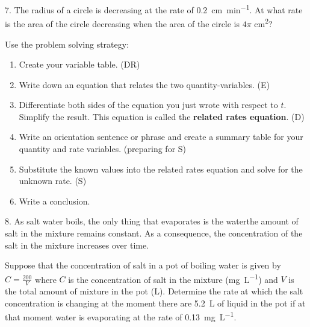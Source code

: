 \documentclass[12pt,]{book}
\newcommand{\terminology}[1]{\textbf{#1}}
\newcommand{\acronym}[1]{#1}
\theoremstyle{plain}
\theoremstyle{definition}
\numberwithin{equation}{section}
\begin{document}
\par\smallskip\noindent
\begin{exerciselist}
\item[7.]\hypertarget{exercise-548}{\null}The radius of a circle is decreasing at the rate of \SI{0.2}{\centi\meter\per\minute}. At what rate is the area of the circle decreasing when the area of the circle is \(4\pi\) \si{\centi\meter\tothe{2}}?%
\par
Use the problem solving strategy:%
\begin{enumerate}[label=(\alph*)]
\item{}Create your variable table. (\acronym{DR})\item{}Write down an equation that relates the two quantity-variables. (\acronym{E})\item{}Differentiate both sides of the equation you just wrote with respect to \(t\). Simplify the result. This equation is called the \terminology{related rates equation}. (\acronym{D})\item{}Write an orientation sentence or phrase and create a summary table for your quantity and rate variables. (preparing for \acronym{S})\item{}Substitute the known values into the related rates equation and solve for the unknown rate. (\acronym{S})\item{}Write a conclusion.\end{enumerate}
\par\smallskip
\item[8.]\hypertarget{exercise-549}{\null}As salt water boils, the only thing that evaporates is the water\textemdash{}the amount of salt in the mixture remains constant. As a consequence, the concentration of the salt in the mixture increases over time.%
\par
Suppose that the concentration of salt in a pot of boiling water is given by \(C=\frac{200}{V}\) where \(C\) is the concentration of salt in the mixture (\si{\milli\gram\per\liter}) and \(V\) is the total amount of mixture in the pot (\si{\liter}). Determine the rate at which the salt concentration is changing at the moment there are \SI{5.2}{\liter} of liquid in the pot if at that moment water is evaporating at the rate of \SI{0.13}{\milli\gram\per\liter}.%
\par\smallskip
\end{exerciselist}
\typeout{************************************************}
\typeout{************************************************}
\end{document}
